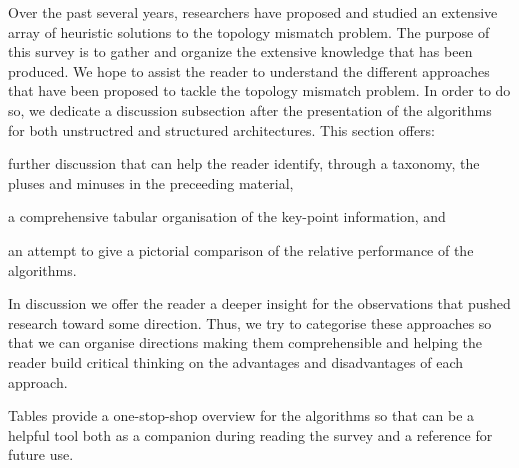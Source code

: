Over the past several years, researchers have proposed and studied an extensive
array of heuristic solutions to the topology mismatch problem. The purpose of
this survey is to gather and organize the extensive knowledge that has been
produced. We hope to assist the reader to understand the different approaches
that have been proposed to tackle the topology mismatch problem. In order to do
so, we dedicate a discussion subsection after the presentation of the algorithms
for both unstructred and structured architectures. This section offers:
\begin{inparaenum}
  \item further discussion that can help the reader identify, through
a taxonomy, the pluses and minuses in the preceeding material,
  \item a comprehensive tabular organisation of the key-point information, and
  \item an attempt to give a pictorial comparison of the relative performance of
the algorithms.
\end{inparaenum}

In discussion we offer the reader a deeper insight for the observations that
pushed research toward some direction. Thus, we try to categorise these
approaches so that we can organise directions making them comprehensible
and helping the reader build critical thinking on the advantages and
disadvantages of each approach.

Tables provide a one-stop-shop overview for the algorithms so that can be a
helpful tool both as a companion during reading the survey and a reference for
future use.

